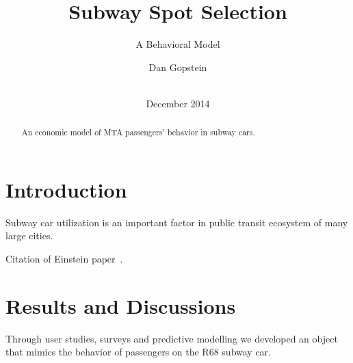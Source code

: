 \documentclass{acm_proc_article-sp}
\begin{document}
\title{Subway Spot Selection}
\subtitle{A Behavioral Model}

\author{
\alignauthor
       Dan Gopstein\\
       \\
}

\date{December 2014}


\maketitle
\begin{abstract}
An economic model of MTA passengers' behavior in subway cars.
\end{abstract}

\section{Introduction}
Subway car utilization is an important factor in public transit ecosystem of many large cities.

Citation of Einstein paper~\cite{Einstein}.

\section{Results and Discussions}
Through user studies, surveys and predictive modelling we developed an object that mimics the behavior of passengers on the R68 subway car.




\end{document}
